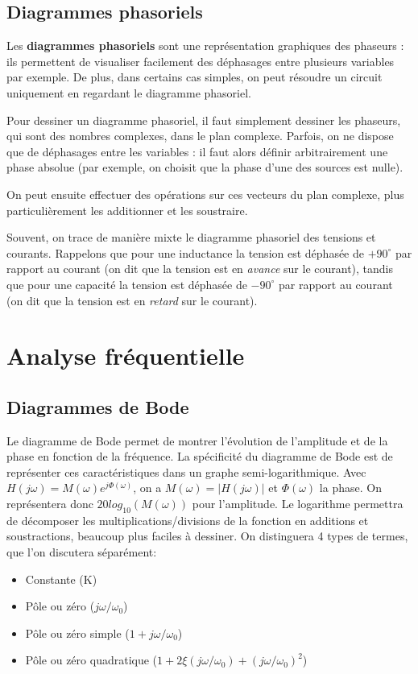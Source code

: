 \subsection{Diagrammes phasoriels}
Les \textbf{diagrammes phasoriels} sont une représentation graphiques des phaseurs : ils permettent de visualiser facilement des déphasages entre plusieurs variables par exemple. De plus, dans certains cas simples, on peut résoudre un circuit uniquement en regardant le diagramme phasoriel.

Pour dessiner un diagramme phasoriel, il faut simplement dessiner les phaseurs, qui sont des nombres complexes, dans le plan complexe. Parfois, on ne dispose que de déphasages entre les variables : il faut alors définir arbitrairement une phase absolue (par exemple, on choisit que la phase d'une des sources est nulle).

On peut ensuite effectuer des opérations sur ces vecteurs du plan complexe, plus particulièrement les additionner et les soustraire.

Souvent, on trace de manière mixte le diagramme phasoriel des tensions et courants. Rappelons que pour une inductance la tension est déphasée de $+90^{\circ}$ par rapport au courant (on dit que la tension est en \textit{avance} sur le courant), tandis que pour une capacité la tension est déphasée de $-90^{\circ}$ par rapport au courant (on dit que la tension est en \textit{retard} sur le courant).

\section{Analyse fréquentielle}
\subsection{Diagrammes de Bode}
Le diagramme de Bode permet de montrer l'évolution de l'amplitude et de la phase en fonction de la fréquence. La spécificité du diagramme de Bode est de représenter ces caractéristiques dans un graphe semi-logarithmique. Avec $H(j\omega) = M(\omega)e^{j\Phi(\omega)}$, on a $M(\omega) = |H(j\omega)|$ et $\Phi(\omega)$ la phase. On représentera donc $20log_{10}(M(\omega))$ pour l'amplitude. Le logarithme permettra de décomposer les multiplications/divisions de la fonction en additions et soustractions, beaucoup plus faciles à dessiner.
On distinguera 4 types de termes, que l'on discutera séparément: \begin{itemize}
\item Constante (K)
\item Pôle ou zéro ($j\omega/\omega_0$)
\item Pôle ou zéro simple ($1 + j\omega/\omega_0$)
\item Pôle ou zéro quadratique ($1 + 2\xi(j\omega/\omega_0) + (j\omega/\omega_0)^2$)
\end{itemize}

